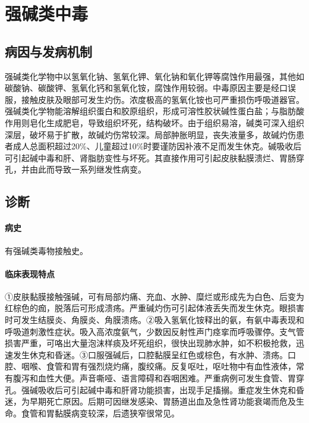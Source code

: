 \protect\hypertarget{text00180.html}{}{}

\section{强碱类中毒}

\subsection{病因与发病机制}

强碱类化学物中以氢氧化钠、氢氧化钾、氧化钠和氧化钾等腐蚀作用最强，其他如碳酸钠、碳酸钾、氢氧化钙和氢氧化铵，腐蚀作用较弱。中毒原因主要是经口误服，接触皮肤及眼部可发生灼伤。浓度极高的氢氧化铵也可严重损伤呼吸道器官。强碱类化学物能溶解组织蛋白和胶原组织，形成可溶性胶状碱性蛋白盐；与脂肪酸作用则皂化生成肥皂，导致组织坏死，结构破坏。由于组织易溶，碱类可深入组织深层，破坏易于扩散，故碱灼伤常较深。局部肿胀明显，丧失液量多，故碱灼伤患者成人总面积超过20\%、儿童超过10\%时要谨防因补液不足而发生休克。碱吸收后可引起碱中毒和肝、肾脂肪变性与坏死。其直接作用可引起皮肤黏膜溃烂、胃肠穿孔，并由此而导致一系列继发性病变。

\subsection{诊断}

\paragraph{病史}

有强碱类毒物接触史。

\paragraph{临床表现特点}

①皮肤黏膜接触强碱，可有局部灼痛、充血、水肿、糜烂或形成先为白色、后变为红棕色的痂，脱落后可形成溃疡。严重碱灼伤可引起体液丢失而发生休克。眼损害时可发生结膜炎、角膜炎、角膜溃疡。②吸入氢氧化铵释出的氨，有氨中毒表现和呼吸道刺激性症状。吸入高浓度氨气，少数因反射性声门痉挛而呼吸骤停。支气管损害严重，可咯出大量泡沫样痰及坏死组织，很快出现肺水肿，如不积极抢救，迅速发生休克和昏迷。③口服强碱后，口腔黏膜呈红色或棕色，有水肿、溃疡。口腔、咽喉、食管和胃有强烈烧灼痛，腹绞痛。反复呕吐，呕吐物中有血性液体，常有腹泻和血性大便。声音嘶哑、语言障碍和吞咽困难。严重病例可发生食管、胃穿孔。强碱吸收后可引起碱中毒和肝肾功能损害，出现手足搐搦。重症发生休克和昏迷，为早期死亡原因。后期可因继发感染、胃肠道出血及急性肾功能衰竭而危及生命。食管和胃黏膜病变较深，后遗狭窄很常见。

